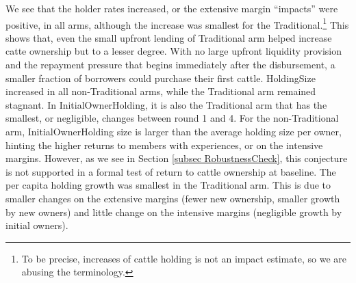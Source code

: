 	We see that the holder rates increased, or the extensive margin ``impacts'' were positive, in all arms, although the increase was smallest for the \textsf{Traditional}.\footnote{To be precise, increases of cattle holding is not an impact estimate, so we are abusing the terminology. } This shows that, even the small upfront lending of \textsf{Traditional} arm helped increase catte ownership but to a lesser degree. With no large upfront liquidity provision and the repayment pressure that begins immediately after the disbursement, a smaller fraction of borrowers could purchase their first cattle. \textsf{HoldingSize} increased in all non-\textsf{Traditional} arms, while the \textsf{Traditional} arm remained stagnant. In \textsf{InitialOwnerHolding}, it is also the \textsf{Traditional} arm that has the smallest, or negligible, changes between round 1 and 4. For the non-\textsf{Traditional} arm, \textsf{InitialOwnerHolding} size is larger than the average holding size per owner, hinting the higher returns to members with experiences, or on the intensive margins. However, as we see in Section \ref{subsec RobustnessCheck}, this conjecture is not supported in a formal test of return to cattle ownership at baseline. The per capita holding growth was smallest in the \textsf{Traditional} arm. This is due to smaller changes on the extensive margins (fewer new ownership, smaller growth by new owners) and little change on the intensive margins (negligible growth by initial owners). 


\begin{figure}
\end{figure}


